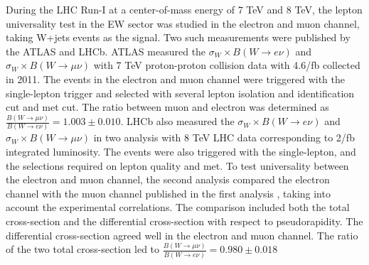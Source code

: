During the LHC Run-I at a center-of-mass energy of 7 TeV and 8 TeV, the lepton universality test in the EW sector was studied in the electron and muon channel, taking W+jets events as the signal. Two such measurements were published by the ATLAS and LHCb. ATLAS measured the $\sigma_W \times B(W \to e \nu)$ and $\sigma_W \times B(W \to \mu \nu)$ \cite{Aaboud:2016btc} with 7 TeV proton-proton collision data with 4.6/fb collected in 2011. The events in the electron and muon channel were triggered with the single-lepton trigger and selected with several lepton isolation and identification cut and met cut. The ratio between muon and electron was determined as $\frac{ B(W  \to \mu \nu) }{ B(W \to e \nu)} = 1.003\pm 0.010$. LHCb also measured the $\sigma_W \times B(W \to e \nu)$ \cite{Aaij:2016qqz} and $\sigma_W \times B(W \to \mu \nu)$ \cite{Aaij:2015zlq} in two analysis with 8 TeV LHC data corresponding to 2/fb integrated luminosity. The events were also triggered with the single-lepton, and the selections required on lepton quality and met. To test universality between the electron and muon channel, the second analysis \cite{Aaij:2016qqz} compared the electron channel with the muon channel published in the first analysis \cite{Aaij:2015zlq}, taking into account the experimental correlations. The comparison included both the total cross-section and the differential cross-section with respect to pseudorapidity. The differential cross-section agreed well in the electron and muon channel. The ratio of the two total cross-section led to $\frac{ B(W  \to \mu \nu) }{ B(W \to e \nu)}  = 0.980 \pm 0.018 $




